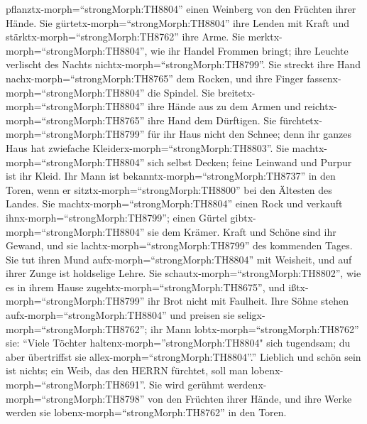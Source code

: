 pflanztx-morph=``strongMorph:TH8804'' einen Weinberg von den Früchten
ihrer Hände.  Sie gürtetx-morph=``strongMorph:TH8804'' ihre
Lenden mit Kraft und stärktx-morph=``strongMorph:TH8762'' ihre Arme.
 Sie merktx-morph=``strongMorph:TH8804'', wie ihr Handel
Frommen bringt; ihre Leuchte verlischt des Nachts
nichtx-morph=``strongMorph:TH8799''.  Sie streckt ihre Hand
nachx-morph=``strongMorph:TH8765'' dem Rocken, und ihre Finger
fassenx-morph=``strongMorph:TH8804'' die Spindel.  Sie
breitetx-morph=``strongMorph:TH8804'' ihre Hände aus zu dem Armen und
reichtx-morph=``strongMorph:TH8765'' ihre Hand dem Dürftigen.
 Sie fürchtetx-morph=``strongMorph:TH8799'' für ihr Haus
nicht den Schnee; denn ihr ganzes Haus hat zwiefache
Kleiderx-morph=``strongMorph:TH8803''.  Sie
machtx-morph=``strongMorph:TH8804'' sich selbst Decken; feine Leinwand
und Purpur ist ihr Kleid.  Ihr Mann ist
bekanntx-morph=``strongMorph:TH8737'' in den Toren, wenn er
sitztx-morph=``strongMorph:TH8800'' bei den Ältesten des Landes.
 Sie machtx-morph=``strongMorph:TH8804'' einen Rock und
verkauft ihnx-morph=``strongMorph:TH8799''; einen Gürtel
gibtx-morph=``strongMorph:TH8804'' sie dem Krämer.  Kraft
und Schöne sind ihr Gewand, und sie lachtx-morph=``strongMorph:TH8799''
des kommenden Tages.  Sie tut ihren Mund
aufx-morph=``strongMorph:TH8804'' mit Weisheit, und auf ihrer Zunge ist
holdselige Lehre.  Sie
schautx-morph=``strongMorph:TH8802'', wie es in ihrem Hause
zugehtx-morph=``strongMorph:TH8675'', und
ißtx-morph=``strongMorph:TH8799'' ihr Brot nicht mit Faulheit.
 Ihre Söhne stehen aufx-morph=``strongMorph:TH8804'' und
preisen sie seligx-morph=``strongMorph:TH8762''; ihr Mann
lobtx-morph=``strongMorph:TH8762'' sie:  ``Viele Töchter
haltenx-morph=''strongMorph:TH8804" sich tugendsam; du aber übertriffst
sie allex-morph=``strongMorph:TH8804''.''  Lieblich und
schön sein ist nichts; ein Weib, das den HERRN fürchtet, soll man
lobenx-morph=``strongMorph:TH8691''.  Sie wird gerühmt
werdenx-morph=``strongMorph:TH8798'' von den Früchten ihrer Hände, und
ihre Werke werden sie lobenx-morph=``strongMorph:TH8762'' in den Toren.
